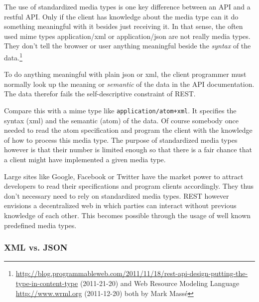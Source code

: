 \documentclass[12pt,a4paper,twoside]{scrartcl}		%
\newcommand{\citeurl}[2]{\url{#1} (#2)}
\begin{document}
The use of standardized media types is one key difference between an API and a
restful API\cite[sec. 5.2.1.2]{Fielding2000}. Only if the client has knowledge
about the media type can it do something meaningful with it besides just
receiving it. In that sense, the often used mime types application/xml or
application/json are not really media types. They don't tell the browser or user
anything meaningful beside the \emph{syntax} of the data.\footnote{
\citeurl{http://blog.programmableweb.com/2011/11/18/rest-api-design-putting-the-type-in-content-type}{2011-21-20}
and Web Resource Modeling Language \citeurl{http://www.wrml.org}{2011-12-20} both by Mark Massé
}

To do anything meaningful with plain json or xml, the client programmer must
normally look up the meaning or \emph{semantic} of the data in the API
documentation. The data therefor fails the self-descriptive constraint of
REST.

Compare this with a mime type like \texttt{application/atom+xml}. It specifies
the syntax (xml) and the semantic (atom) of the data. Of course somebody once
needed to read the atom specification and program the client with the knowledge
of how to process this media type. The purpose of standardized media types
however is that their number is limited enough so that there is a fair chance
that a client might have implemented a given media type.

Large sites like Google, Facebook or Twitter have the market power to attract
developers to read their specifications and program clients accordingly. They
thus don't necessary need to rely on standardized media types. REST however
envisions a decentralized web in which parties can interact without previous
knowledge of each other. This becomes possible through the usage of well known
predefined media types.


\subsubsection{XML vs. JSON}
\end{document}
